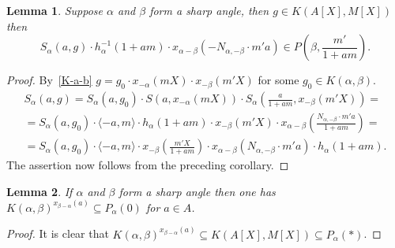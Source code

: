 \documentclass[oneside, 8pt]{amsart}
\newtheorem{corollary}{Corollary}
\newtheorem{lemma}{Lemma}
\theoremstyle{remark}
\theoremstyle{definition}
\numberwithin{equation}{section}
\begin{document}
\begin{lemma} Suppose $\alpha$ and $\beta$ form a sharp angle, then $g \in K(A[X], M[X])$ then 
\[S_\alpha(a, g)\cdot  h^{-1}_\alpha(1 + am) \cdot x_{\alpha-\beta}(-N_{\alpha,-\beta}\cdot m'a) \in P\left(\beta, \frac{m'}{1 + am}\right).\] \end{lemma}
\begin{proof}
 By~\cref{K-a-b} $g = g_0 \cdot x_{-\alpha}(mX) \cdot x_{-\beta}(m'X)$ for some $g_0\in K(\alpha, \beta)$.
 \begin{multline} \nonumber S_\alpha(a, g) = S_\alpha(a, g_0) \cdot S(a, x_{-\alpha}(mX)) \cdot S_\alpha\left(\frac{a}{1+am}, x_{-\beta}(m'X)\right) = \\ = S_\alpha(a, g_0) \cdot \langle -a, m \rangle \cdot h_\alpha(1+am) \cdot x_{-\beta}(m'X) \cdot x_{\alpha-\beta}\left(\frac{N_{\alpha, -\beta} \cdot m'a}{1+am}\right) = \\ =
  S_\alpha(a, g_0) \cdot \langle -a, m \rangle \cdot  x_{-\beta}\left(\frac{m'X}{1+am}\right) \cdot x_{\alpha-\beta}\left(N_{\alpha, -\beta} \cdot m'a\right) \cdot h_\alpha(1+am). \end{multline}
The assertion now follows from the preceding corollary.
\end{proof}

  
\begin{lemma}
 If $\alpha$ and $\beta$ form a sharp angle then one has $K(\alpha, \beta)^{x_{\beta - \alpha}(a)} \subseteq P_\alpha(0)$ for $a \in A$.
\end{lemma}
\begin{proof}
 It is clear that $K(\alpha, \beta)^{x_{\beta - \alpha}(a)} \subseteq K(A[X], M[X]) \subseteq P_\alpha(*)$.
\end{proof}
  

\begin{comment}
\begin{corollary} Suppose $g$ is an element of $P_\alpha(0) \cap K(A[X], M[X])$. Then $ev^*_{X=0}(S_\alpha(a, g))$ lies in the subgroup $U(Z_+(\alpha), M)$. \end{corollary}
\begin{proof}
 By~\cref{Kgen-strong} and~\cref{P0_normal} $g$ can be expressed as a product of elements 
 $z_\beta(Xf, \xi)$, $\beta\in\Phi\setminus\{\pm \alpha\}$, $c_\gamma(f, X\xi)$ for some $\gamma$ orthogonal to $\alpha$, $x_{-\alpha}(X^2f)$, $x_{\alpha}(f)$.
 
 It remains to notice that the only factors in the right-hand sides of in~\eqref{eq:Zconj1}--\eqref{eq:Zconj3} which do not vanish after evaluation at $X=0$
  are those of the form $x_\beta(m)$ for some $\beta \in Z_+(\alpha)$.
\end{proof}
\end{comment}
\end{document}
